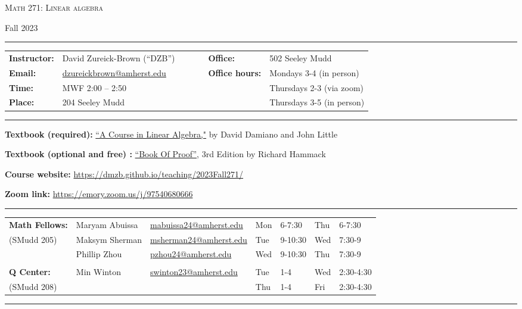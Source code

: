 \documentclass[12pt]{article}
\begin{document}
\begin{center}
{\Large \textsc{Math 271: Linear algebra}}
\end{center}
\begin{center}
Fall 2023
\end{center}

\hrule \smallskip

\noindent \begin{tabular}{@{}llcccll}
\textbf{Instructor:} & David Zureick-Brown (``DZB'') & & & & \textbf{Office:} & 502 Seeley Mudd \\
 \textbf{Email:} & \href{mailto: dzureickbrown@amherst.edu}{dzureickbrown@amherst.edu} & & & & \textbf{Office hours:} & Mondays 3-4 (in person)\\
 \textbf{Time:} & MWF 2:00 -- 2:50 & & & & &Thursdays 2-3 (via zoom) \\
 \textbf{Place:} & 204 Seeley Mudd & & & & & Thursdays 3-5 (in person)
\end{tabular}

\smallskip \hrule \medskip

\noindent\textbf{Textbook (required):}
\href{https://www.amazon.com/Course-Linear-Algebra-Dover-Mathematics/dp/0486469085}
{``A Course in Linear Algebra,"} by David Damiano and John Little
\medskip

\noindent\textbf{Textbook (optional and free) :}
\href{https://www.people.vcu.edu/~rhammack/BookOfProof/}
{``Book Of Proof'',} 3rd Edition by Richard Hammack
\medskip

\noindent\textbf{Course website:} \url{https://dmzb.github.io/teaching/2023Fall271/}
\medskip

\noindent\textbf{Zoom link:} \url{https://emory.zoom.us/j/97540680666}

\medskip \hrule \smallskip

\noindent \begin{tabular}{@{}lllllll}

\textbf{Math Fellows:} & Maryam Abuissa & \href{mailto: mabuissa24@amherst.edu}{mabuissa24@amherst.edu} & Mon &6-7:30 & Thu & 6-7:30 \\
(SMudd 205) & Maksym Sherman & \href{mailto: msherman24@amherst.edu}{msherman24@amherst.edu} & Tue & 9-10:30 & Wed & 7:30-9 \\
& Phillip Zhou & \href{mailto: pzhou24@amherst.edu}{pzhou24@amherst.edu} & Wed &9-10:30 & Thu & 7:30-9 \\
 & & & & & &\\ 
\textbf{Q Center:}& Min Winton & \href{mailto: swinton23@amherst.edu}{swinton23@amherst.edu} &Tue &1-4 & Wed &2:30-4:30 \\
(SMudd 208)&&&Thu&1-4&Fri&2:30-4:30
\end{tabular}
\smallskip \hrule \medskip          
\end{document}
